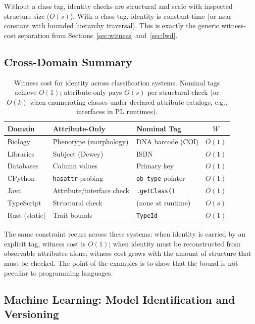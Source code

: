 Without a class tag, identity checks are structural and scale with inspected structure size ($O(s)$). With a class tag, identity is constant-time (or near-constant with bounded hierarchy traversal). This is exactly the generic witness-cost separation from Sections~\ref{sec:witness} and~\ref{sec:lwd}.

\subsection{Cross-Domain Summary}

\begin{table}[ht]
\centering
\begin{tabular}{|l|l|l|c|}
\hline
\textbf{Domain} & \textbf{Attribute-Only} & \textbf{Nominal Tag} & \textbf{$W$} \\
\hline
Biology & Phenotype (morphology) & DNA barcode (COI) & $O(1)$ \\
Libraries & Subject (Dewey) & ISBN & $O(1)$ \\
Databases & Column values & Primary key & $O(1)$ \\
CPython & \texttt{hasattr} probing & \texttt{ob\_type} pointer & $O(1)$ \\
Java & Attribute/interface check & \texttt{.getClass()} & $O(1)$ \\
TypeScript & Structural check & (none at runtime) & $O(s)$ \\
Rust (static) & Trait bounds & \texttt{TypeId} & $O(1)$ \\
\hline
\end{tabular}
\caption{Witness cost for identity across classification systems. Nominal tags achieve $O(1)$; attribute-only pays $O(s)$ per structural check (or $O(k)$ when enumerating classes under declared attribute catalogs, e.g., interfaces in PL runtimes).}
\end{table}

The same constraint recurs across these systems: when identity is carried by an explicit tag, witness cost is $O(1)$; when identity must be reconstructed from observable attributes alone, witness cost grows with the amount of structure that must be checked. The point of the examples is to show that the bound is not peculiar to programming languages.

\subsection{Machine Learning: Model Identification and Versioning}

